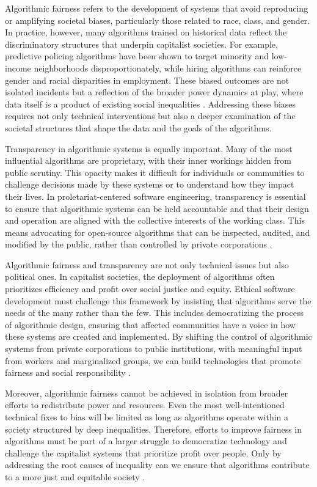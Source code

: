 \begin{refsection}
Algorithmic fairness refers to the development of systems that avoid reproducing or amplifying societal biases, particularly those related to race, class, and gender. In practice, however, many algorithms trained on historical data reflect the discriminatory structures that underpin capitalist societies. For example, predictive policing algorithms have been shown to target minority and low-income neighborhoods disproportionately, while hiring algorithms can reinforce gender and racial disparities in employment. These biased outcomes are not isolated incidents but a reflection of the broader power dynamics at play, where data itself is a product of existing social inequalities \cite[pp.~102-105]{noble2019}. Addressing these biases requires not only technical interventions but also a deeper examination of the societal structures that shape the data and the goals of the algorithms.

Transparency in algorithmic systems is equally important. Many of the most influential algorithms are proprietary, with their inner workings hidden from public scrutiny. This opacity makes it difficult for individuals or communities to challenge decisions made by these systems or to understand how they impact their lives. In proletariat-centered software engineering, transparency is essential to ensure that algorithmic systems can be held accountable and that their design and operation are aligned with the collective interests of the working class. This means advocating for open-source algorithms that can be inspected, audited, and modified by the public, rather than controlled by private corporations \cite[pp.~89-91]{eubanks2019}.

Algorithmic fairness and transparency are not only technical issues but also political ones. In capitalist societies, the deployment of algorithms often prioritizes efficiency and profit over social justice and equity. Ethical software development must challenge this framework by insisting that algorithms serve the needs of the many rather than the few. This includes democratizing the process of algorithmic design, ensuring that affected communities have a voice in how these systems are created and implemented. By shifting the control of algorithmic systems from private corporations to public institutions, with meaningful input from workers and marginalized groups, we can build technologies that promote fairness and social responsibility \cite[pp.~670-672]{barocas2016}.

Moreover, algorithmic fairness cannot be achieved in isolation from broader efforts to redistribute power and resources. Even the most well-intentioned technical fixes to bias will be limited as long as algorithms operate within a society structured by deep inequalities. Therefore, efforts to improve fairness in algorithms must be part of a larger struggle to democratize technology and challenge the capitalist systems that prioritize profit over people. Only by addressing the root causes of inequality can we ensure that algorithms contribute to a more just and equitable society \cite[pp.~45-47]{benkler2010}.


\end{refsection}
